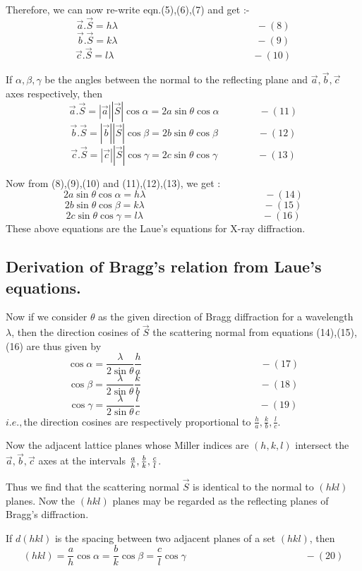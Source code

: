 \documentclass[12pt]{article}
\begin{document}
Therefore, we can now re-write eqn.(5),(6),(7) and get :-
$$ \vec{a}.\vec{S} = h\lambda \qquad\qquad\qquad\qquad\qquad\qquad\qquad -(8)$$
$$ \vec{b}.\vec{S} = k\lambda \qquad\qquad\qquad\qquad\qquad\qquad\qquad -(9)$$
$$ \vec{c}.\vec{S} = l\lambda \qquad\qquad\qquad\qquad\qquad\qquad\qquad -(10)$$

If $\alpha,\beta,\gamma$ be the angles between the normal to the reflecting plane and $\vec{a},\vec{b},\vec{c}$ axes respectively, then
$$ \vec{a}.\vec{S} = |\vec{a}||\vec{S}|\cos \alpha = 2a\sin\theta\cos\alpha \qquad\qquad -(11)$$
$$ \vec{b}.\vec{S} = |\vec{b}||\vec{S}|\cos \beta = 2b\sin\theta\cos\beta   \qquad\qquad -(12)$$
$$ \vec{c}.\vec{S} = |\vec{c}||\vec{S}|\cos \gamma = 2c\sin\theta\cos\gamma \qquad\qquad -(13)$$

Now from (8),(9),(10) and (11),(12),(13), we get :
$$ 2a\sin\theta\cos\alpha = h\lambda   \qquad\qquad\qquad\qquad\qquad\qquad -(14)$$
$$ 2b\sin\theta\cos\beta  = k\lambda   \qquad\qquad\qquad\qquad\qquad\qquad -(15)$$
$$ 2c\sin\theta\cos\gamma = l\lambda   \qquad\qquad\qquad\qquad\qquad\qquad -(16)$$
These above equations are the Laue's equations for X-ray diffraction.


\subsection{Derivation of Bragg's relation from Laue's equations.}
Now if we consider $\theta$ as the given direction of Bragg diffraction for a wavelength $\lambda$, then the direction cosines of $\vec{S}$ the scattering normal from equations (14),(15),(16) are thus given by
$$ \cos \alpha = \frac{\lambda}{2\sin\theta}\frac{h}{a} \qquad\qquad\qquad\qquad\qquad\qquad -(17)$$
$$ \cos \beta = \frac{\lambda}{2\sin\theta}\frac{k}{b} \qquad\qquad\qquad\qquad\qquad\qquad -(18)$$
$$ \cos \gamma = \frac{\lambda}{2\sin\theta}\frac{l}{c} \qquad\qquad\qquad\qquad\qquad\qquad -(19)$$
$i.e.,$the direction cosines are respectively proportional to $\frac{h}{a},\frac{k}{b},\frac{l}{c}$.

Now the adjacent lattice planes whose Miller indices are $(h,k,l)$ intersect the $\vec{a},\vec{b},\vec{c}$ axes at the intervals $\large{\frac{a}{h},\frac{b}{k},\frac{c}{l}}$.

Thus we find that the scattering normal $\vec{S}$ is identical to the normal to $(hkl)$ planes.
Now the $(hkl)$ planes may be regarded as the reflecting planes of Bragg's diffraction.

If $d(hkl)$ is the spacing between two adjacent planes of a set $(hkl)$, then
$$(hkl)=\frac{a}{h}\cos\alpha=\frac{b}{k}\cos\beta=\frac{c}{l}\cos\gamma \qquad\qquad\qquad\qquad\qquad\qquad -(20)$$
\end{document}
